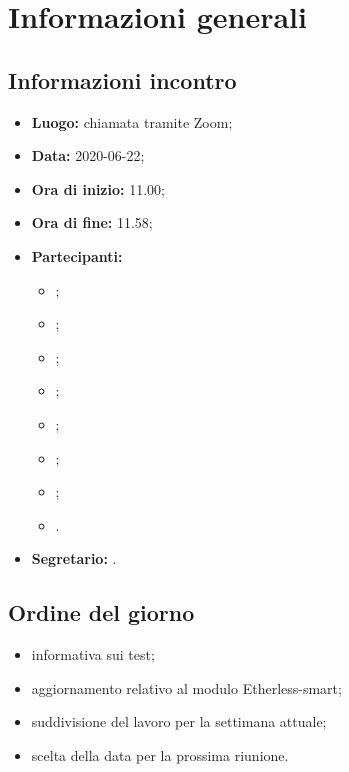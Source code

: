 \section{Informazioni generali}
\subsection{Informazioni incontro}
\begin{itemize}
	\item \textbf{Luogo:} chiamata tramite Zoom;
	\item \textbf{Data:} 2020-06-22;
	\item \textbf{Ora di inizio:} 11.00;
	\item \textbf{Ora di fine:} 11.58;
	\item \textbf{Partecipanti:}
		\begin{itemize}
			\item \VB;
			\item \LB;
			\item \NF;
			\item \EG;
			\item \FJ;
			\item \MP;
			\item \AS;
			\item \AZ.
		\end{itemize}
	\item \textbf{Segretario:} \AS.
\end{itemize}

\subsection{Ordine del giorno}
\begin{itemize}
	\item informativa sui test;
	\item aggiornamento relativo al modulo Etherless-smart;
	\item suddivisione del lavoro per la settimana attuale;
	\item scelta della data per la prossima riunione.
\end{itemize}
